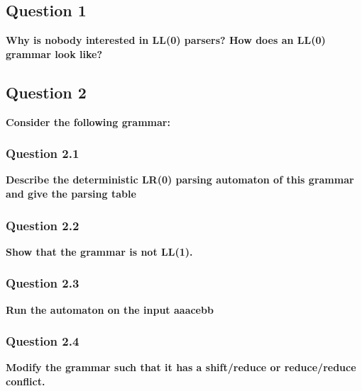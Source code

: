 \subsection{Question 1}
    \textbf{Why is nobody interested in LL(0) parsers? How does an LL(0) grammar look like?}

    

\subsection{Question 2}

    \textbf{Consider the following grammar:}

    
    \subsubsection{Question 2.1}
        \textbf{Describe the deterministic LR(0) parsing automaton of this grammar and give the parsing table}


        

    \subsubsection{Question 2.2}
        \textbf{Show that the grammar is not LL(1).}

        

    \subsubsection{Question 2.3}
        \textbf{Run the automaton on the input aaacebb}

        

    \subsubsection{Question 2.4}
        \textbf{Modify the grammar such that it has a shift/reduce or reduce/reduce conflict.}

        